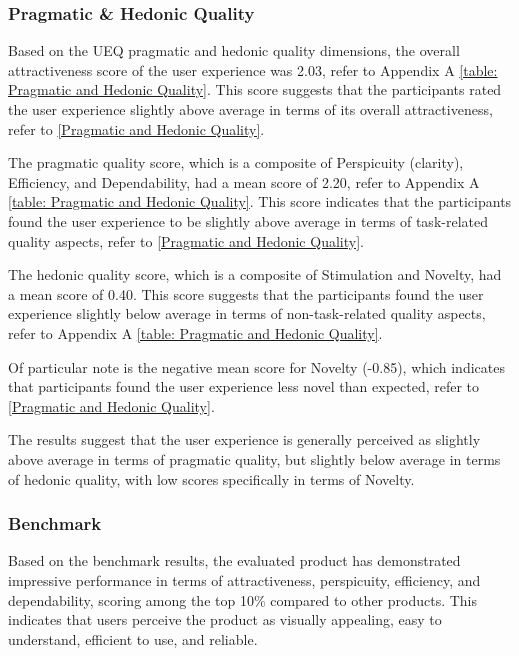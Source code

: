 \documentclass[conference,onecolumn]{IEEEtran}
\begin{document}
        \subsubsection  {Pragmatic \& Hedonic Quality}\hfill
        
            Based on the UEQ pragmatic and hedonic quality dimensions, the overall attractiveness score of the user experience was 2.03, refer to Appendix A \tablename{ \ref{table: Pragmatic and Hedonic Quality}}. This score suggests that the participants rated the user experience slightly above average in terms of its overall attractiveness, refer to \figurename{\ref{Pragmatic and Hedonic Quality}}.

            The pragmatic quality score, which is a composite of Perspicuity (clarity), Efficiency, and Dependability, had a mean score of 2.20, refer to Appendix A \tablename{ \ref{table: Pragmatic and Hedonic Quality}}. This score indicates that the participants found the user experience to be slightly above average in terms of task-related quality aspects, refer to \figurename{\ref{Pragmatic and Hedonic Quality}}.

            The hedonic quality score, which is a composite of Stimulation and Novelty, had a mean score of 0.40. This score suggests that the participants found the user experience slightly below average in terms of non-task-related quality aspects, refer to Appendix A \tablename{ \ref{table: Pragmatic and Hedonic Quality}}.

            Of particular note is the negative mean score for Novelty (-0.85), which indicates that participants found the user experience less novel than expected, refer to \figurename{\ref{Pragmatic and Hedonic Quality}}.

            The results suggest that the user experience is generally perceived as slightly above average in terms of pragmatic quality, but slightly below average in terms of hedonic quality, with low scores specifically in terms of Novelty.

        \subsubsection{Benchmark}\hfill

            Based on the benchmark results, the evaluated product has demonstrated impressive performance in terms of attractiveness, perspicuity, efficiency, and dependability, scoring among the top 10\% compared to other products. This indicates that users perceive the product as visually appealing, easy to understand, efficient to use, and reliable.
\end{document}
